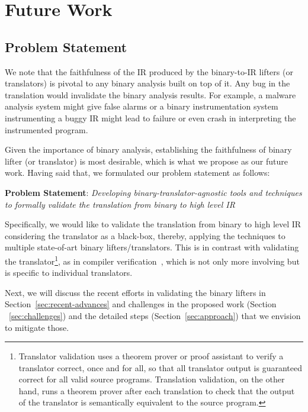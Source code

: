\chapter{Future Work}\label{sec:problem}
\section{Problem Statement}\label{sec:statement}

We note that the faithfulness of the IR produced by the binary-to-IR lifters
(or translators) is pivotal to any binary analysis built on top of it.  Any bug
in the translation would invalidate the binary analysis results. For example, a
malware analysis system might give false alarms or a binary instrumentation
system instrumenting a buggy IR might lead to failure or even crash in
interpreting the instrumented program.

Given the importance of binary analysis, establishing the faithfulness of
binary lifter (or translator) is most desirable, which is what we propose as
our future work. Having said that, we formulated our problem statement as follows:

\vspace{10pt}

\noindent\textbf{Problem Statement}: \emph{Developing
  binary-translator-agnostic tools and techniques to formally validate the
    translation from binary to high level IR}

Specifically, we would like to validate the translation from binary to high
level IR considering the translator as a black-box, thereby, applying the
techniques to multiple state-of-art binary lifters/translators. This is
in contrast with  validating the translator\footnote{Translator validation uses a
  theorem prover or proof assistant to verify a translator correct, once and
    for all, so that all translator output is guaranteed correct for all valid
      source programs. Translation validation, on the other hand, runs a
        theorem prover after each translation to check that the output of the
        translator is semantically equivalent to the source program.}, as
         in  compiler verification~\cite{Leroy:2009}, which
        is not only more involving but is specific to individual
        translators.

Next, we will discuss the recent efforts in validating the binary lifters in
Section~\ref{sec:recent-advances} and challenges in the proposed work (Section
    ~\ref{sec:challenges}) and the detailed steps (Section~\ref{sec:approach})
that we envision to mitigate those.

